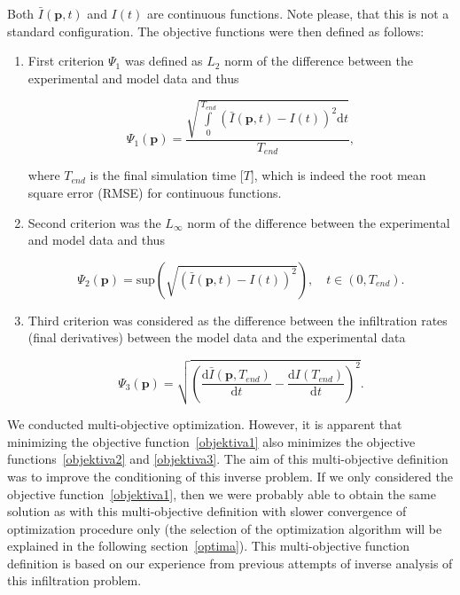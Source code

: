 \documentclass[review,times,3p,10pt]{elsarticle}
\newenvironment{lineq}
    {\begin{linenomath*}
    \begin{equation}
    }
    { 
    \end{equation} 
    \end{linenomath*}
    }
\newcommand{\dd}{\mathrm{d}}
\renewcommand{\vec}{\mathbf}
\begin{document}
 Both $\bar{I}(\vec{p},t)$ and $I(t)$ are continuous functions. Note please, that this is not a standard configuration. The objective functions were then defined as follows:
\begin{enumerate}[label={\bf \Roman*}.]
\item First criterion $\Psi_1$ was defined as $L_2$ norm of the difference between the  experimental and model data and thus
\begin{lineq}
\label{objektiva1}
\Psi_1 (\vec{p}) = \frac{\sqrt{\int\limits_0^{T_{end}} \left( \bar{I}(\vec{p},t) - I(t) \right)^2 \dd t}}{T_{end}},
\end{lineq}
where $T_{end}$ is the final simulation time [$T$], which is indeed the root mean square error (RMSE) for continuous functions. 
\item Second criterion was the $L_{\infty}$ norm of the difference between the experimental and model data and thus
\begin{lineq}
\label{objektiva2}
\Psi_2 (\vec{p}) = \mathrm{sup} \left( \sqrt{\left( \bar{I}(\vec{p},t) - I(t) \right)^2} \right), \quad  t \in (0, T_{end}).
\end{lineq}
\item Third criterion was considered as the difference between the infiltration rates (final derivatives) between the model data and the experimental data
\begin{lineq}
\label{objektiva3}
\Psi_3 (\vec{p}) =  \sqrt{\left( \frac{\dd \bar{I}(\vec{p},T_{end})}{\dd t} - \frac{\dd I(T_{end})}{\dd t} \right)^2}.
\end{lineq}


\end{enumerate}

We conducted multi-objective optimization. However, it is apparent that minimizing the objective function~\eqref{objektiva1} also minimizes the objective functions~\eqref{objektiva2} and \eqref{objektiva3}. The aim of this multi-objective definition was to improve the conditioning of this inverse problem. If we only considered the objective function~\eqref{objektiva1}, then we were probably able to obtain the same solution as with this multi-objective definition with slower convergence of optimization procedure only (the selection of the optimization algorithm will be explained in the following section~\ref{optima}). This multi-objective function definition is based on our experience from previous attempts of inverse analysis of this infiltration problem.
\end{document}
